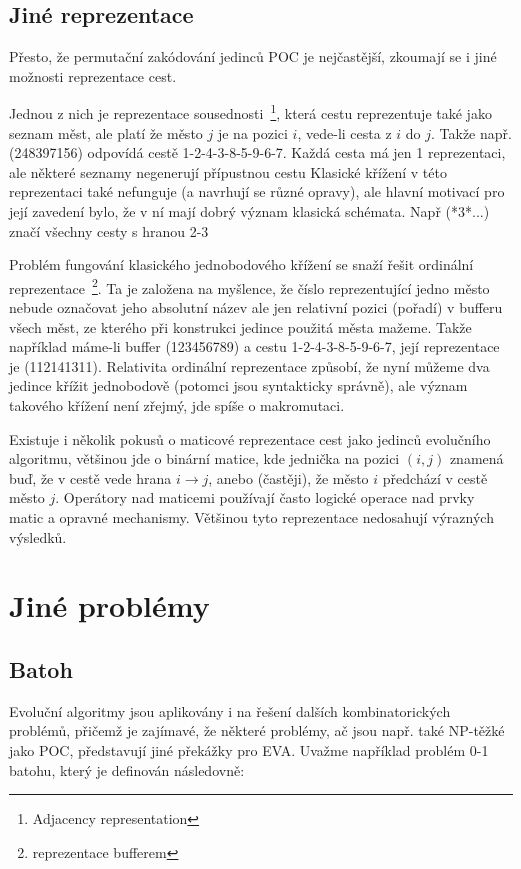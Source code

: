 \subsection{Jiné reprezentace}

Přesto, že permutační zakódování jedinců POC je nejčastější, zkoumají se i jiné možnosti reprezentace cest. 

Jednou z nich je reprezentace sousednosti~\footnote{Adjacency representation}, která cestu reprezentuje také jako seznam měst, ale 
platí že město $j$ je na pozici $i$, vede-li cesta z $i$ do $j$. Takže např. 
(248397156) odpovídá cestě 1-2-4-3-8-5-9-6-7. Každá cesta má jen 1 reprezentaci, ale některé seznamy negenerují přípustnou cestu
Klasické křížení v této reprezentaci také nefunguje (a navrhují se různé opravy), ale hlavní motivací pro její zavedení bylo, že 
v ní mají dobrý význam klasická schémata. Např  (*3*...) značí všechny cesty s hranou 2-3

Problém fungování klasického jednobodového křížení se snaží řešit ordinální reprezentace~\footnote{reprezentace bufferem}. Ta je založena na myšlence, že číslo reprezentující jedno město nebude označovat jeho absolutní název ale jen relativní pozici (pořadí) v bufferu všech měst, ze kterého při konstrukci jedince použitá města mažeme. Takže například máme-li buffer (123456789) a cestu 1-2-4-3-8-5-9-6-7, její reprezentace je (112141311).
Relativita ordinální reprezentace způsobí, že nyní můžeme dva jedince křížit jednobodově (potomci jsou syntakticky správně), ale význam takového křížení není zřejmý, jde spíše o makromutaci.

Existuje i několik pokusů o  maticové reprezentace cest jako jedinců evolučního algoritmu, většinou jde o binární matice, kde jednička na pozici $(i,j)$ znamená buď, že v cestě vede hrana $i\to j$, anebo (častěji), že město $i$ předchází v cestě město $j$. Operátory nad maticemi používají často logické operace nad prvky matic a opravné mechanismy. Většinou tyto reprezentace nedosahují výrazných výsledků. 

\section{Jiné problémy}

\subsection{Batoh}


Evoluční algoritmy jsou aplikovány i na řešení dalších kombinatorických problémů, přičemž je zajímavé, že některé problémy, ač jsou např. také NP-těžké jako POC, představují jiné překážky pro EVA. Uvažme například problém 0-1 batohu, který je definován následovně: 

